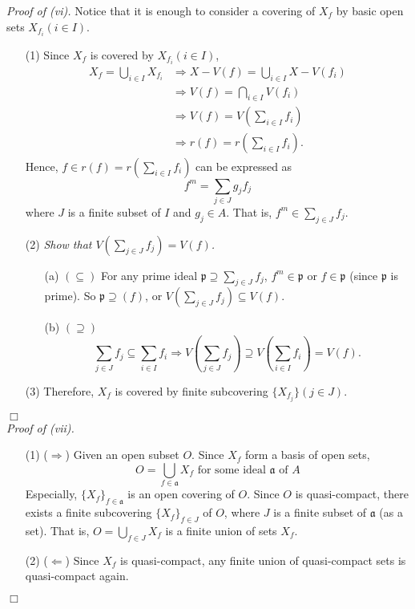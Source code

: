 \documentclass{article}
\begin{document}
\emph{Proof of (vi).}
Notice that it is enough to consider a covering of $X_f$
by basic open sets $X_{f_i} (i \in I)$.
\begin{enumerate}
\item[(1)]
Since $X_f$ is covered by $X_{f_i} (i \in I)$,
\begin{align*}
X_f = \bigcup_{i \in I} X_{f_i}
&\Longrightarrow X - V(f) = \bigcup_{i \in I} X - V(f_i) \\
&\Longrightarrow V(f) = \bigcap_{i \in I} V(f_i) \\
&\Longrightarrow V(f) = V\left( \sum_{i \in I} f_i \right) \\
&\Longrightarrow r(f) = r\left( \sum_{i \in I} f_i \right).
\end{align*}
Hence, $f \in r(f) = r\left( \sum_{i \in I} f_i \right)$ can be expressed as
$$f^m = \sum_{j \in J} g_j f_j$$
where $J$ is a finite subset of $I$ and $g_j \in A$.
That is, $f^m \in \sum_{j \in J} f_j$.
\item[(2)]
\emph{Show that $V\left( \sum_{j \in J} f_j \right) = V(f)$.}
\begin{enumerate}
  \item[(a)]
  $(\subseteq)$ For any prime ideal $\mathfrak{p} \supseteq \sum_{j \in J} f_j$,
  $f^m \in \mathfrak{p}$ or $f \in \mathfrak{p}$ (since $\mathfrak{p}$ is prime).
  So $\mathfrak{p} \supseteq (f)$,
  or $V\left( \sum_{j \in J} f_j \right) \subseteq V(f)$.
  \item[(b)]
  $(\supseteq)$
  $$\sum_{j \in J} f_j \subseteq \sum_{i \in I} f_i
  \Longrightarrow
  V\left( \sum_{j \in J} f_j \right) \supseteq V\left( \sum_{i \in I} f_i \right) = V(f).$$
\end{enumerate}
\item[(3)]
Therefore, $X_f$ is covered by finite subcovering $\{X_{f_j}\} (j \in J)$.
\end{enumerate}
$\Box$ \\

\emph{Proof of (vii).}
\begin{enumerate}
\item[(1)]
($\Longrightarrow$)
Given an open subset $O$.
Since $X_f$ form a basis of open sets,
$$O = \bigcup_{f \in \mathfrak{a}} X_f \text{ for some ideal $\mathfrak{a}$ of $A$}$$
Especially, $\{X_f\}_{f \in \mathfrak{a}}$ is an open covering of $O$.
Since $O$ is quasi-compact, there exists a finite subcovering $\{X_f\}_{f \in J}$ of $O$,
where $J$ is a finite subset of $\mathfrak{a}$ (as a set).
That is,
$O = \bigcup_{f \in J} X_f$ is a finite union of sets $X_f$.
\item[(2)]
($\Longleftarrow$)
Since $X_f$ is quasi-compact, any finite union of quasi-compact sets is quasi-compact again.
\end{enumerate}
$\Box$ \\\\
\end{document}
